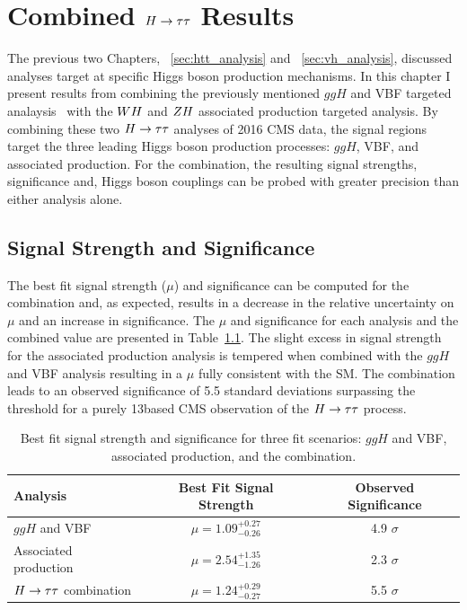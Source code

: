 \chapter{Combined $H\to\tau\tau$ Results}
\label{sec:cmb_results}

The previous two Chapters, ~\ref{sec:htt_analysis} and ~\ref{sec:vh_analysis}, discussed
analyses target at specific Higgs boson production mechanisms. In this chapter
I present results from combining the previously mentioned 
$ggH$ and VBF targeted analaysis~\cite{cms_13TeV_htt_jhep_2017}
with the $WH$ and $ZH$ associated production targeted analysis.
By combining these two $H\to\tau\tau$ analyses of
2016 CMS data, the signal regions target the three leading Higgs 
boson production processes: $ggH$, VBF, and associated production. 
For the combination, the resulting signal strengths, significance and, Higgs
boson couplings can be probed with greater precision than either analysis alone.

\section{Signal Strength and Significance}
The best fit signal strength ($\mu$) and significance can be computed for the combination and, 
as expected, results in a decrease in the relative uncertainty on $\mu$ and an increase
in significance. The $\mu$ and significance
for each analysis and the combined value are presented in Table~\ref{tab:cmb_mu_and_sig}.
The slight excess in signal strength for the associated production analysis is tempered
when combined with the $ggH$ and VBF analysis resulting in a $\mu$ fully consistent 
with the SM. The combination leads to an 
observed significance of 5.5 standard deviations surpassing the threshold for a
purely 13\TeV based CMS observation of the $H\to\tau\tau$ process. 

\begin{table}[htbp]
\renewcommand{\arraystretch}{1.3}
\centering
\begin{tabular}{lcc}
Analysis         &   Best Fit Signal Strength    &   Observed Significance    \\
\hline
$ggH$ and VBF             &   $\mu = 1.09 ^{+0.27} _{-0.26}$   &  4.9 $\sigma$     \\
Associated production     &   $\mu = 2.54 ^{+1.35} _{-1.26}$   &  2.3 $\sigma$     \\
$H\to\tau\tau$ combination        &   $\mu = 1.24 ^{+0.29} _{-0.27}$   &  5.5 $\sigma$     \\
\hline
\end{tabular}
\caption{
Best fit signal strength and significance for three fit scenarios: $ggH$ and VBF,
associated production, and the combination.
}
\label{tab:cmb_mu_and_sig}
\end{table}


